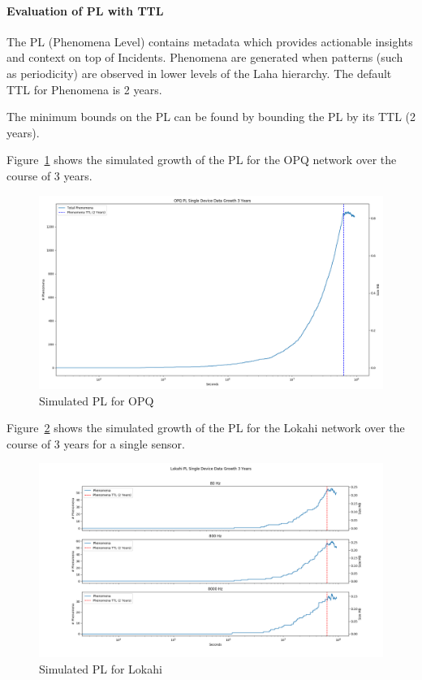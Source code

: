 \paragraph{Evaluation of PL with TTL}

The PL (Phenomena Level) contains metadata which provides actionable insights and context on top of Incidents. Phenomena are generated when patterns (such as periodicity) are observed in lower levels of the Laha hierarchy. The default TTL for Phenomena is 2 years.

The minimum bounds on the PL can be found by bounding the PL by its TTL (2 years).

Figure~\ref{fig:sim_pl_opq} shows the simulated growth of the PL for the OPQ network over the course of 3 years.

\begin{figure}[H]
	\centering
	\includegraphics[width=\linewidth]{figures/sim_pl_opq.png}
	\caption{Simulated PL for OPQ}
	\label{fig:sim_pl_opq}
\end{figure}

Figure~\ref{fig:sim_pl_lokahi} shows the simulated growth of the PL for the Lokahi network over the course of 3 years for a single sensor.

\begin{figure}[H]
	\centering
	\includegraphics[width=\linewidth]{figures/sim_pl_lokahi.png}
	\caption{Simulated PL for Lokahi}
	\label{fig:sim_pl_lokahi}
\end{figure}

